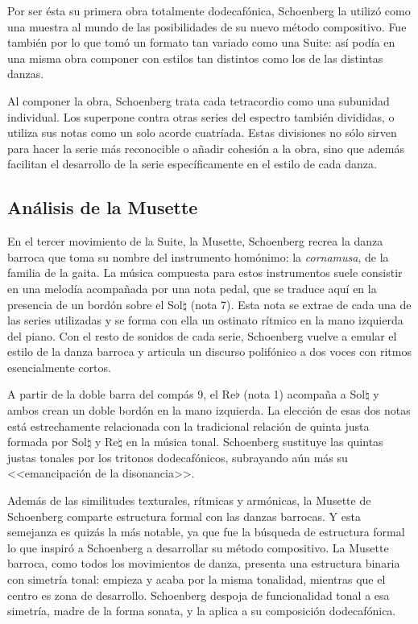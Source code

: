         Por ser \'esta su primera obra totalmente dodecaf\'onica, Schoenberg la utiliz\'o como una muestra al mundo de las posibilidades de su nuevo m\'etodo compositivo. Fue tambi\'en por lo que tom\'o un formato tan variado como una Suite: as\'i pod\'ia en una misma obra componer con estilos tan distintos como los de las distintas danzas.
        
        Al componer la obra, Schoenberg trata cada tetracordio como una subunidad individual. Los superpone contra otras series del espectro tambi\'en divididas, o utiliza sus notas como un solo acorde cuatr\'iada. Estas divisiones no s\'olo sirven para hacer la serie m\'as reconocible o a\~nadir cohesi\'on a la obra, sino que adem\'as facilitan el desarrollo de la serie espec\'ificamente en el estilo de cada danza.
		
	\subsection{An\'alisis de la Musette}
	\label{musette}
		En el tercer movimiento de la Suite, la Musette, Schoenberg recrea la danza barroca que toma su nombre del instrumento hom\'onimo: la \emph{cornamusa}, de la familia de la gaita. La m\'usica compuesta para estos instrumentos suele consistir en una melod\'ia acompa\~nada por una nota pedal, que se traduce aqu\'i en la presencia de un bord\'on sobre el Sol$\natural$ (nota 7). Esta nota se extrae de cada una de las series utilizadas y se forma con ella un ostinato r\'itmico en la mano izquierda del piano. Con el resto de sonidos de cada serie, Schoenberg vuelve a emular el estilo de la danza barroca y articula un discurso polif\'onico a dos voces con ritmos esencialmente cortos.
		
		A partir de la doble barra del comp\'as 9, el Re$\flat$ (nota 1) acompa\~na a Sol$\natural$ y ambos crean un doble bord\'on en la mano izquierda. La elecci\'on de esas dos notas est\'a estrechamente relacionada con la tradicional relaci\'on de quinta justa formada por Sol$\natural$ y Re$\natural$ en la m\'usica tonal. Schoenberg sustituye las quintas justas tonales por los tritonos dodecaf\'onicos, subrayando a\'un m\'as su <<emancipaci\'on de la disonancia>>.
		
		Adem\'as de las similitudes texturales, r\'itmicas y arm\'onicas, la Musette de Schoenberg comparte estructura formal con las danzas barrocas. Y esta semejanza es quiz\'as la m\'as notable, ya que fue la b\'usqueda de estructura formal lo que inspir\'o a Schoenberg a desarrollar su m\'etodo compositivo. La Musette barroca, como todos los movimientos de danza, presenta una estructura binaria con simetr\'ia tonal: empieza y acaba por la misma tonalidad, mientras que el centro es zona de desarrollo. Schoenberg despoja de funcionalidad tonal a esa simetr\'ia, madre de la forma sonata, y la aplica a su composici\'on dodecaf\'onica.
		

